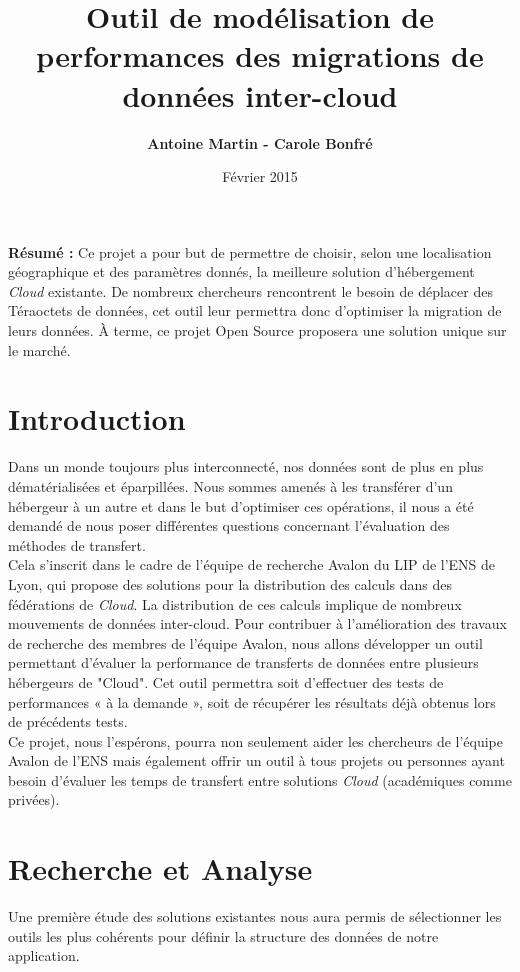 \documentclass[10pt]{article}
\title{\Huge{Outil de modélisation de performances des migrations de données inter-cloud}}
\author{\textbf{Antoine Martin - Carole Bonfré} }
\date{Février 2015}
\begin{document}
\maketitle

\textbf{Résumé : } Ce projet a pour but de permettre de choisir, selon
une localisation géographique et des paramètres donnés, la meilleure
solution d'hébergement \textit{Cloud} existante. De nombreux chercheurs
rencontrent le besoin de déplacer des Téraoctets de données, cet outil
leur permettra donc d'optimiser la migration de leurs données. À
terme, ce projet Open Source proposera une solution unique sur le
marché.

\section{Introduction}

Dans un monde toujours plus interconnecté, nos données sont de plus en
plus dématérialisées et éparpillées. Nous sommes amenés à les
transférer d’un hébergeur à un autre et dans le but d’optimiser ces
opérations, il nous a été demandé de nous poser différentes questions
concernant l’évaluation des méthodes de transfert.\\

Cela s’inscrit dans le cadre de l’équipe de recherche Avalon du LIP de
l’ENS de Lyon, qui propose des solutions pour la distribution des
calculs dans des fédérations de \textit{Cloud}. La distribution de ces calculs
implique de nombreux mouvements de données inter-cloud. Pour
contribuer à l’amélioration des travaux de recherche des membres de
l’équipe Avalon, nous allons développer un outil permettant d’évaluer
la performance de transferts de données entre plusieurs hébergeurs de
"Cloud". Cet outil permettra soit d’effectuer des tests de
performances « à la demande », soit de récupérer les résultats déjà
obtenus lors de précédents tests.\\

Ce projet, nous l’espérons, pourra non seulement aider les chercheurs
de l’équipe Avalon de l’ENS mais également offrir un outil à tous
projets ou personnes ayant besoin d’évaluer les temps de transfert
entre solutions \textit{Cloud} (académiques comme privées).

\section{Recherche et Analyse}
Une première étude des solutions existantes nous aura permis de
sélectionner les outils les plus cohérents pour définir la structure
des données de notre application.
\end{document}
